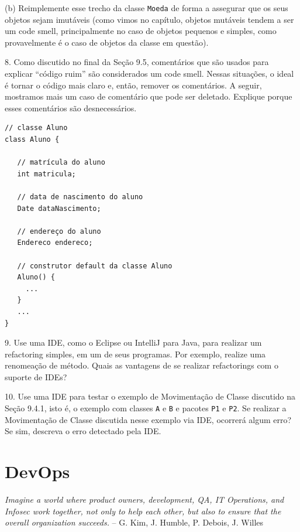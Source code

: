 \documentclass[
  11pt,
  twoside]{book}
\newcommand{\passthrough}[1]{#1}
\renewenvironment{quote}{\centering \vspace{1.5ex} \begin{tcolorbox}[colback=backcolor, width=4.9in]}{\end{tcolorbox}}
\begin{document}
(b) Reimplemente esse trecho da classe \passthrough{\lstinline!Moeda!}
de forma a assegurar que os seus objetos sejam imutáveis (como vimos no
capítulo, objetos mutáveis tendem a ser um code smell, principalmente no
caso de objetos pequenos e simples, como provavelmente é o caso de
objetos da classe em questão).

8. Como discutido no final da Seção 9.5, comentários que são usados para
explicar ``código ruim'' são considerados um code smell. Nessas
situações, o ideal é tornar o código mais claro e, então, remover os
comentários. A seguir, mostramos mais um caso de comentário que pode ser
deletado. Explique porque esses comentários são desnecessários.

\begin{lstlisting}
// classe Aluno
class Aluno {
   
   // matrícula do aluno
   int matricula;
   
   // data de nascimento do aluno
   Date dataNascimento;
   
   // endereço do aluno
   Endereco endereco;
   
   // construtor default da classe Aluno
   Aluno() {
     ...
   } 
   ...  
}
\end{lstlisting}

9. Use uma IDE, como o Eclipse ou IntelliJ para Java, para realizar um
refactoring simples, em um de seus programas. Por exemplo, realize uma
renomeação de método. Quais as vantagens de se realizar refactorings com
o suporte de IDEs?

10. Use uma IDE para testar o exemplo de Movimentação de Classe
discutido na Seção 9.4.1, isto é, o exemplo com classes
\passthrough{\lstinline!A!} e \passthrough{\lstinline!B!} e pacotes
\passthrough{\lstinline!P1!} e \passthrough{\lstinline!P2!}. Se realizar
a Movimentação de Classe discutida nesse exemplo via IDE, ocorrerá algum
erro? Se sim, descreva o erro detectado pela IDE.

\hypertarget{devops}{%
\chapter{DevOps}\label{devops}}

\begin{quote}
\emph{Imagine a world where product owners, development, QA, IT
Operations, and Infosec work together, not only to help each other, but
also to ensure that the overall organization succeeds.} -- G. Kim, J.
Humble, P. Debois, J. Willes
\end{quote}
\end{document}
